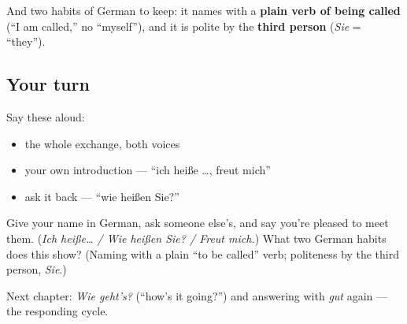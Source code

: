 And two habits of German to keep: it names with a \textbf{plain verb of being called} (\textquotedblleft{}I am called,\textquotedblright{} no \textquotedblleft{}myself\textquotedblright{}), and it is polite by the \textbf{third person} (\emph{Sie} = \textquotedblleft{}they\textquotedblright{}).

\subsection*{Your turn}
Say these aloud:

\begin{itemize}
\raggedright
  \item the whole exchange, both voices
  \item your own introduction — \textquotedblleft{}ich heiße …, freut mich\textquotedblright{}
  \item ask it back — \textquotedblleft{}wie heißen Sie?\textquotedblright{}
\end{itemize}

\begin{tcolorbox}[breakable,colback=teal!4,colframe=teal!35!black,title={Before you move on}]
Give your name in German, ask someone else's, and say you're pleased to meet them. (\emph{Ich heiße… / Wie heißen Sie? / Freut mich.}) What two German habits does this show? (Naming with a plain \textquotedblleft{}to be called\textquotedblright{} verb; politeness by the third person, \emph{Sie}.)

Next chapter: \emph{Wie geht's?} (\textquotedblleft{}how's it going?\textquotedblright{}) and answering with \emph{gut} again — the responding cycle.
\end{tcolorbox}
